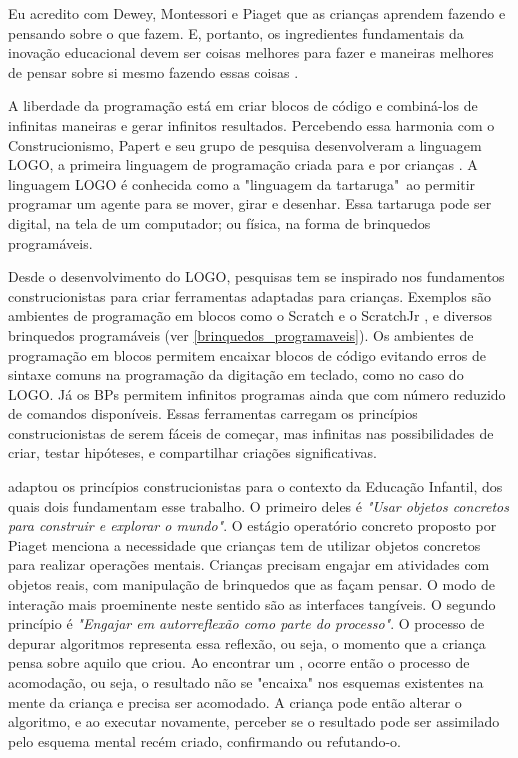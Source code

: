 \begin{citacao}
Eu acredito com Dewey, Montessori e Piaget que as crianças aprendem fazendo e pensando sobre o que fazem. E, portanto, os ingredientes fundamentais da inovação educacional devem ser coisas melhores para fazer e maneiras melhores de pensar sobre si mesmo fazendo essas coisas \cite[p.3, tradução nossa]{papert_teaching_1972}. 
\end{citacao}

A liberdade da programação está em criar blocos de código e combiná-los de infinitas maneiras e gerar infinitos resultados. Percebendo essa harmonia com o Construcionismo, Papert e seu grupo de pesquisa desenvolveram a linguagem LOGO, a primeira linguagem de programação criada para e por crianças \cite{solomon_history_2020}. A linguagem LOGO é conhecida como a "linguagem da tartaruga"\ ao permitir programar um agente para se mover, girar e desenhar. Essa tartaruga pode ser digital, na tela de um computador; ou física, na forma de brinquedos programáveis.

Desde o desenvolvimento do LOGO, pesquisas tem se inspirado nos fundamentos construcionistas para criar ferramentas adaptadas para crianças. Exemplos são ambientes de programação em blocos como o Scratch e o ScratchJr \cite{flannery_designing_2013}, e diversos brinquedos programáveis (ver \autoref{brinquedos_programaveis}). Os ambientes de programação em blocos permitem encaixar blocos de código evitando erros de sintaxe comuns na programação da digitação em teclado, como no caso do LOGO. Já os BPs permitem infinitos programas ainda que com número reduzido de comandos disponíveis. Essas ferramentas carregam os princípios construcionistas de serem fáceis de começar, mas infinitas nas possibilidades de criar, testar hipóteses, e compartilhar criações significativas.

 adaptou os princípios construcionistas para o contexto da Educação Infantil, dos quais dois fundamentam esse trabalho. O primeiro deles é \textit{"Usar objetos concretos para construir e explorar o mundo"}. O estágio operatório concreto proposto por Piaget menciona a necessidade que crianças tem de utilizar objetos concretos para realizar operações mentais. Crianças precisam engajar em atividades com objetos reais, com manipulação de brinquedos que as façam pensar. O modo de interação mais proeminente neste sentido são as interfaces tangíveis. O segundo princípio é \textit{"Engajar em autorreflexão como parte do processo"}. O processo de depurar algoritmos representa essa reflexão, ou seja, o momento que a criança pensa sobre aquilo que criou. Ao encontrar um \bug, ocorre então o processo de acomodação, ou seja, o resultado não se "encaixa" nos esquemas existentes na mente da criança e precisa ser acomodado. A criança pode então alterar o algoritmo, e ao executar novamente, perceber se o resultado pode ser assimilado pelo esquema mental recém criado, confirmando ou refutando-o.
    
